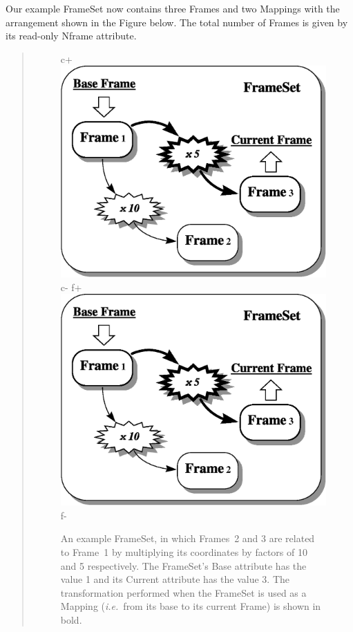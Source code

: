 \documentclass[twoside,11pt]{article}
\begin{document}
\begin{htmlonly}
   Our example FrameSet now contains three Frames and two Mappings with
   the arrangement shown in the Figure below. The total number of Frames
   is given by its read-only Nframe attribute.
   \begin{quote}
   \begin{figure}
   \label{fig:fsexample}
c+
   \includegraphics[scale=0.9]{sun211_figures/fsexample.eps}
c-
f+
   \includegraphics[scale=0.9]{sun210_figures/fsexample.eps}
f-
   \caption{An example FrameSet, in which Frames~2 and 3 are related to
   Frame~1 by multiplying its coordinates by factors of 10 and 5
   respectively. The FrameSet's Base attribute has the value 1 and its
   Current attribute has the value 3. The transformation performed when
   the FrameSet is used as a Mapping ({\em{i.e.}}\ from its base to
   its current Frame) is shown in bold.}
   \end{figure}
   \end{quote}
\end{htmlonly}
\end{document}
